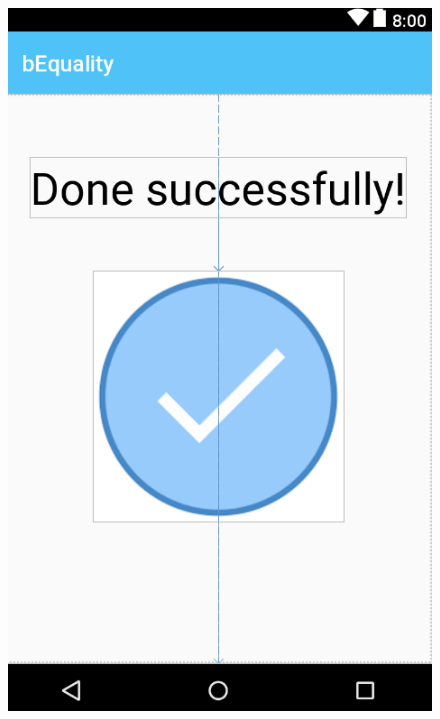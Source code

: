 \documentclass[portrait,a4paper]{article}
\begin{document}
\begin{figure}[!htb]
			\endminipage\hfill
  				\includegraphics[width=\linewidth]{Bilder/App_4_lastpage}
  				
			\endminipage
		\end{figure}
		
\end{document}
